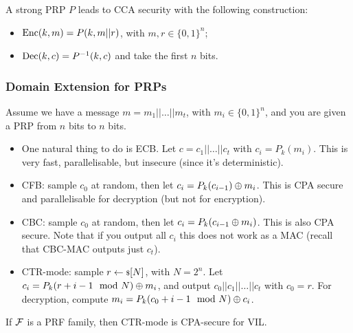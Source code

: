 A strong \ac{PRP} $P$ leads to \ac{CCA} security with the following construction:
\begin{itemize}
	\item $\mathrm{Enc}(k,m) = P(k, m || r)$, with $m,r \in \{0,1\}^{n}$; 
	\item $\mathrm{Dec}(k, c) = P^{-1}(k,c)$ and take the first $n$ bits.
\end{itemize}

\subsubsection{Domain Extension for \aclp{PRP}}

Assume we have a message $m = m_1 || \dots || m_t$, with $m_i \in \{0,1\}^{n}$, and you are given a \ac{PRP} from $n$ bits to $n$ bits.
\begin{itemize}
	\item One natural thing to do is \ac{ECB}.
		Let $c = c_1 || \dots || c_t$ with $c_i = P_k(m_i)$.
		This is very fast, parallelisable, but insecure (since it's deterministic).
	\item \ac{CFB}: sample $c_0$ at random, then let $c_i = P_k(c_{i-1}) \oplus m_i$.
		This is \ac{CPA} secure and parallelisable for decryption (but not for encryption).
	\item \ac{CBC}: sample $c_0$ at random, then let $c_i = P_k(c_{i-1} \oplus m_i)$.
		This is also \ac{CPA} secure.
		Note that if you output all $c_i$ this does not work as a \ac{MAC} (recall that \ac{CBC}-\ac{MAC} outputs just $c_t$).
	\item \ac{CTR}-mode: sample $r \leftarrow {\scriptstyle \$} {[N]}$, with $N = 2^{n}$.
		Let $c_i = P_k(r + i - 1 \mod N) \oplus m_i$, and output $c_0 || c_1 || \dots || c_t$ with $c_0 = r$.
		For decryption, compute $m_i = P_k(c_0 + i - 1 \mod N) \oplus c_i$.
\end{itemize}

\begin{theorem} \label{thm:ctr-mode-cpa-secure-vil}
	If $\mathcal{F}$ is a \ac{PRF} family, then \ac{CTR}-mode is \ac{CPA}-secure for \ac{VIL}.
\end{theorem}

